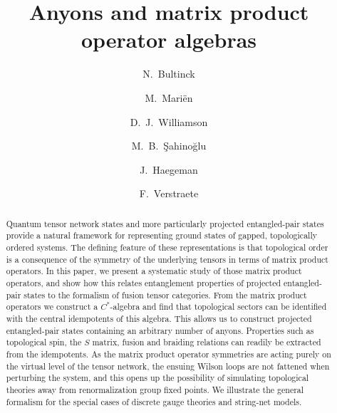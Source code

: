 \documentclass[12 pt]{article}
\title{\textbf{Anyons and matrix product operator algebras}}
\author[a]{N.~Bultinck}
\author[a]{M.~Mari\"en}
\author[b]{D.~J.~Williamson}
\author[b]{M.~B.~Şahinoğlu}
\author[a]{J.~Haegeman}
\author[a,b]{F.~Verstraete}
\affil[a]{\small{\emph{Department of Physics and Astronomy, Ghent University}}}
\affil[b]{\small{\emph{Vienna Center for Quantum Technology, University of Vienna}}}
\begin{document}
  \maketitle

\begin{abstract}
Quantum tensor network states and more particularly projected entangled-pair states provide a natural framework for representing ground states of gapped, topologically ordered systems. The defining feature of these representations is that topological order is a consequence of the symmetry of the underlying tensors in terms of matrix product operators. In this paper, we present a systematic study of those matrix product operators, and show how this relates entanglement properties of projected entangled-pair states to the formalism of fusion tensor categories. From the matrix product operators we construct a $C^*$-algebra and find that topological sectors can be identified with the central idempotents of this algebra. This allows us to construct projected entangled-pair states containing an arbitrary number of anyons. Properties such as topological spin, the $S$ matrix, fusion and braiding relations can readily be extracted from the idempotents. As the matrix product operator symmetries are acting purely on the virtual level of the tensor network, the ensuing Wilson loops are not fattened when perturbing the system, and this opens up the possibility of simulating topological theories away from renormalization group fixed points. We illustrate the general formalism for the special cases of discrete gauge theories and string-net models.

\end{abstract}

\pagebreak
\tableofcontents
\end{document}
